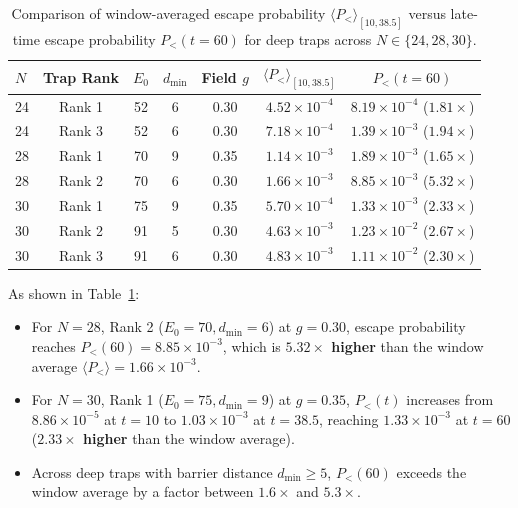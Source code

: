 \documentclass[12pt,a4paper]{report}
\begin{document}
\begin{table}[htbp]
\centering
\small
\caption{Comparison of window-averaged escape probability $\langle P_< \rangle_{[10, 38.5]}$ versus late-time escape probability $P_<(t = 60)$ for deep traps across $N \in \{24, 28, 30\}$.}
\label{tab:window_underestimation}
\begin{tabular}{lcccccc}
\toprule
$N$ & Trap Rank & $E_0$ & $d_{\min}$ & Field $g$ & $\langle P_< \rangle_{[10, 38.5]}$ & $P_<(t = 60)$ \\
\midrule
24 & Rank 1 & 52 & 6 & 0.30 & $4.52 \times 10^{-4}$ & $8.19 \times 10^{-4}$ ($1.81\times$) \\
24 & Rank 3 & 52 & 6 & 0.30 & $7.18 \times 10^{-4}$ & $1.39 \times 10^{-3}$ ($1.94\times$) \\
28 & Rank 1 & 70 & 9 & 0.35 & $1.14 \times 10^{-3}$ & $1.89 \times 10^{-3}$ ($1.65\times$) \\
28 & Rank 2 & 70 & 6 & 0.30 & $1.66 \times 10^{-3}$ & $8.85 \times 10^{-3}$ ($5.32\times$) \\
30 & Rank 1 & 75 & 9 & 0.35 & $5.70 \times 10^{-4}$ & $1.33 \times 10^{-3}$ ($2.33\times$) \\
30 & Rank 2 & 91 & 5 & 0.30 & $4.63 \times 10^{-3}$ & $1.23 \times 10^{-2}$ ($2.67\times$) \\
30 & Rank 3 & 91 & 6 & 0.30 & $4.83 \times 10^{-3}$ & $1.11 \times 10^{-2}$ ($2.30\times$) \\
\bottomrule
\end{tabular}
\end{table}

As shown in Table~\ref{tab:window_underestimation}:
\begin{itemize}
    \item For $N = 28$, Rank 2 ($E_0 = 70, d_{\min} = 6$) at $g = 0.30$, escape probability reaches $P_<(60) = 8.85 \times 10^{-3}$, which is \textbf{$5.32\times$ higher} than the window average $\langle P_< \rangle = 1.66 \times 10^{-3}$.
    \item For $N = 30$, Rank 1 ($E_0 = 75, d_{\min} = 9$) at $g = 0.35$, $P_<(t)$ increases from $8.86 \times 10^{-5}$ at $t = 10$ to $1.03 \times 10^{-3}$ at $t = 38.5$, reaching $1.33 \times 10^{-3}$ at $t = 60$ (\textbf{$2.33\times$ higher} than the window average).
    \item Across deep traps with barrier distance $d_{\min} \ge 5$, $P_<(60)$ exceeds the window average by a factor between $1.6\times$ and $5.3\times$.
\end{itemize}
\end{document}
